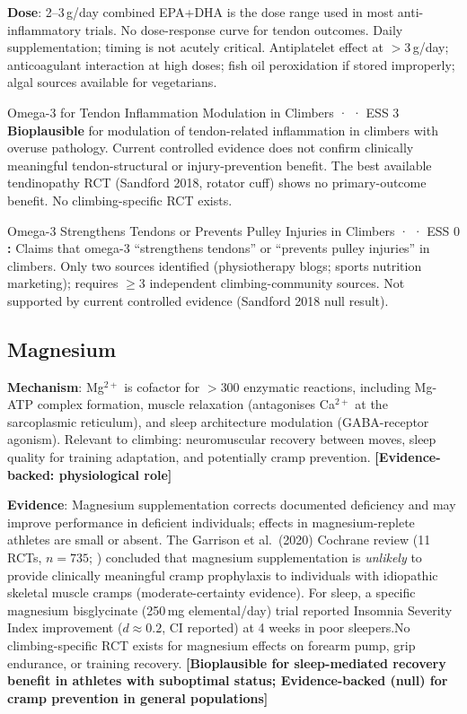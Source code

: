 \textbf{Dose}: 2--3\,g/day combined EPA+DHA is the dose range used in most anti-inflammatory trials. No dose-response curve for tendon outcomes. Daily supplementation; timing is not acutely critical. Antiplatelet effect at $>$3\,g/day; anticoagulant interaction at high doses; fish oil peroxidation if stored improperly; algal sources available for vegetarians.

\begin{bioplausbox}{Omega-3 for Tendon Inflammation Modulation in Climbers · \bioplausible · ESS 3}
\textbf{Bioplausible} for modulation of tendon-related inflammation in climbers with overuse pathology. Current controlled evidence does not confirm clinically meaningful tendon-structural or injury-prevention benefit. The best available tendinopathy RCT (Sandford 2018, rotator cuff) shows no primary-outcome benefit. No climbing-specific RCT exists.
\end{bioplausbox}

\begin{toverifybox}{Omega-3 Strengthens Tendons or Prevents Pulley Injuries in Climbers · \toverify · ESS 0}
\textbf{\toverify:} Claims that omega-3 ``strengthens tendons'' or ``prevents pulley injuries'' in climbers. Only two sources identified (physiotherapy blogs; sports nutrition marketing); requires $\geq$3 independent climbing-community sources. Not supported by current controlled evidence (Sandford 2018 null result).
\end{toverifybox}

\subsection{Magnesium}
\label{subsec:magnesium}

\textbf{Mechanism}: Mg$^{2+}$ is cofactor for $>$300 enzymatic reactions, including Mg-ATP complex formation, muscle relaxation (antagonises Ca$^{2+}$ at the sarcoplasmic reticulum), and sleep architecture modulation (GABA-receptor agonism). Relevant to climbing: neuromuscular recovery between moves, sleep quality for training adaptation, and potentially cramp prevention. \textbf{[Evidence-backed: physiological role]}

\textbf{Evidence}: Magnesium supplementation corrects documented deficiency and may improve performance in deficient individuals; effects in magnesium-replete athletes are small or absent. The Garrison et al.\ (2020) Cochrane review (11 RCTs, $n{=}735$; \cite{GKK+20}) concluded that magnesium supplementation is \textit{unlikely} to provide clinically meaningful cramp prophylaxis to individuals with idiopathic skeletal muscle cramps (moderate-certainty evidence). For sleep, a specific magnesium bisglycinate (250\,mg elemental/day) trial reported Insomnia Severity Index improvement ($d{\approx}0.2$, CI reported) at 4 weeks in poor sleepers.\singlesource No climbing-specific RCT exists for magnesium effects on forearm pump, grip endurance, or training recovery. \textbf{[Bioplausible for sleep-mediated recovery benefit in athletes with suboptimal status; Evidence-backed (null) for cramp prevention in general populations]}

